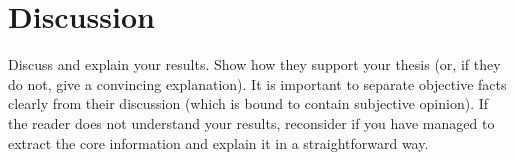 \chapter{Discussion} \label{Discussion}

Discuss and explain your results. Show how they support your thesis (or, if they do not, give a convincing explanation). It is important to separate objective facts clearly from their discussion (which is bound to contain subjective opinion). If the reader does not understand your results, reconsider if you have managed to extract the core information and explain it in a straightforward way.

